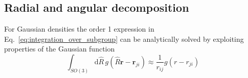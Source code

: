 \subsection{Radial and angular decomposition}
%
For Gaussian densities the order 1 expression in Eq.~\eqref{eq:integration_over_subgroup} can be analytically solved by exploiting properties of the Gaussian function\cite{musil2019machine}
\begin{equation}
  \label{eq:order1_analytical_solution}
  \int_{SO(3)} \mathrm{d}\hat{R}\, g(\hat{R}\mathbf{r}-\mathbf{r}_{ji}) %
  \approx \frac{1}{r_{ij}}g(r-r_{ji})
\end{equation}
